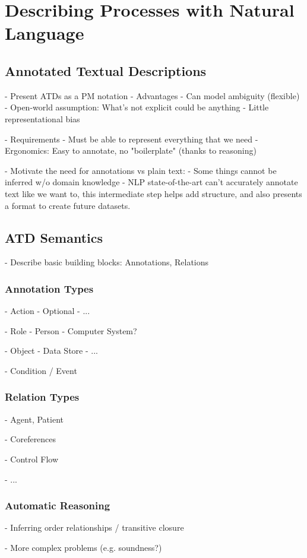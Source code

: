 \chapter{Describing Processes with Natural Language}
\label{cha:atd}

\section{Annotated Textual Descriptions}

- Present ATDs as a PM notation
- Advantages
  - Can model ambiguity (flexible)
  - Open-world assumption: What's not explicit could be anything
  - Little representational bias 

- Requirements
  - Must be able to represent everything that we need
  - Ergonomics: Easy to annotate, no "boilerplate" (thanks to reasoning)

- Motivate the need for annotations vs plain text:
  - Some things cannot be inferred w/o domain knowledge
  - NLP state-of-the-art can't accurately annotate text like we want to, this
  intermediate step helps add structure, and also presents a format to create
  future datasets.

\section{ATD Semantics}

- Describe basic building blocks: Annotations, Relations
  
\subsection{Annotation Types}

- Action
  - Optional
  - ...
 
- Role
  - Person
  - Computer System?

- Object
  - Data Store
  - ...

- Condition / Event


\subsection{Relation Types}

- Agent, Patient

- Coreferences

- Control Flow

- ...

\subsection{Automatic Reasoning}

- Inferring order relationships / transitive closure

- More complex problems (e.g. soundness?)


